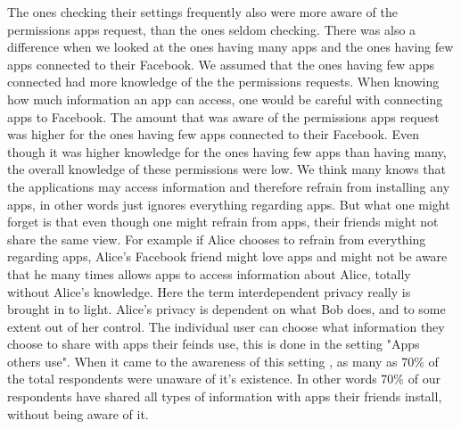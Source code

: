 The ones checking their settings frequently also were more aware of the permissions apps request, than the ones seldom checking. There was also a difference when we looked at the ones having many apps and the ones having few apps connected to their Facebook. We assumed that the ones having few apps connected had more knowledge of the the permissions requests. When knowing how much information an app can access, one would be careful with connecting apps to Facebook. The amount that was aware of the permissions apps request was higher for the ones having few apps connected to their Facebook. Even though it was higher knowledge for the ones having few apps than having many, the overall knowledge of these permissions were low. We think many knows that the applications may access information and therefore refrain from installing any apps, in other words just ignores everything regarding apps. But what one might forget is that even though one might refrain from apps, their friends might not share the same view. For example if Alice chooses to refrain from everything regarding apps, Alice's Facebook friend might love apps and might not be aware that he many times allows apps to access information about Alice, totally without Alice's knowledge. Here the term interdependent privacy really is brought in to light. Alice's privacy is dependent on what Bob does, and to some extent out of her control.   
The individual user can choose what information they choose to share with apps their feinds use, this is done in the setting "Apps others use". When it came to the awareness of this setting , as many as 70\% of the total respondents were unaware of it's existence. In other words 70\% of our respondents have shared all types of information with apps their friends install, without being aware of it.

